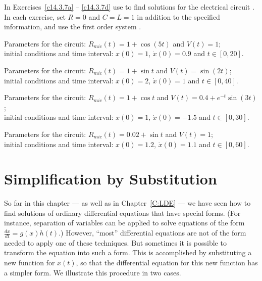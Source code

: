 \documentclass{ximera}
\begin{document}
\CEXER

\noindent In Exercises~\ref{c14.3.7a} -- \ref{c14.3.7d} use \Matlab
to find solutions for the electrical circuit 
.  In each exercise, set $R=0$ and $C=L=1$ in addition to 
the specified information, and use the first order system .

\begin{exercise} \label{c14.3.7a}
Parameters for the circuit: $R_{mic}(t) = 1+\cos(5t)$ and $V(t) = 1$;\\
initial conditions and time interval: $x(0) = 1$, $\dot{x}(0) = 0.9$ and  
$t\in[0,20]$.
\end{exercise}

\begin{exercise} \label{c14.3.7b}
Parameters for the circuit: $R_{mic}(t) = 1+\sin t$ and $V(t) = \sin(2t)$;\\
initial conditions and time interval: $x(0) = 2$, $\dot{x}(0) = 1$ and $t\in[0,40]$.
\end{exercise}

\begin{exercise} \label{c14.3.7c}
Parameters for the circuit: $R_{mic}(t) = 1+\cos t$ and $V(t) = 0.4+e^{-t}\sin(3t)$;\\
initial conditions and time interval: $x(0) = 1$, $\dot{x}(0) = -1.5$ and 
$t\in[0,30]$.
\end{exercise}

\begin{exercise} \label{c14.3.7d}
Parameters for the circuit: $R_{mic}(t) = 0.02+\sin t$ and $V(t) = 1$;\\
initial conditions and time interval: $x(0) = 1.2$, $\dot{x}(0) = 1.1$ and 
$t\in[0,60]$.
\end{exercise}



\section{Simplification by Substitution}
\label{sec:SBS}

So far in this chapter --- as well as in Chapter~\ref{C:LDE} ---
we have seen how to find solutions of ordinary differential equations 
that have special forms.  (For instance, separation of variables can 
be applied to solve equations of the form $\frac{dx}{dt}=g(x) h(t)$.) 
However, ``most'' differential equations are not of the form needed to
apply one of these techniques.  But sometimes it is possible to
transform the equation into such a form.  This is accomplished
by substituting a new function for $x(t)$, so that the differential 
equation for this new function has a simpler form.  We illustrate this 
procedure in two cases.
\end{document}
